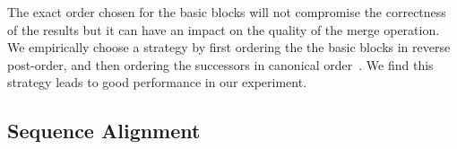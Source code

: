 The exact order chosen for the basic blocks will not compromise the correctness of the results but it can have an impact on the quality of
the merge operation. We empirically choose a strategy by first ordering the the basic blocks in reverse post-order, and then ordering the
successors in canonical order~\cite{briggs94,liu96}. We find this strategy leads to good performance in our experiment.


\subsection{Sequence Alignment}


